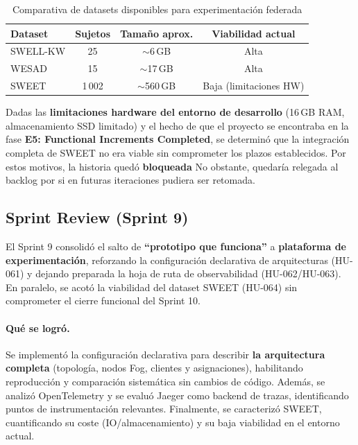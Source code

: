 \documentclass{report}
\begin{document}
\begin{table}[H]
\centering
\footnotesize
\caption{Comparativa de datasets disponibles para experimentación federada}
\label{tab:dataset_comparison}
\renewcommand{\arraystretch}{1.2}
\begin{tabular}{|l|c|c|c|}
\hline
\textbf{Dataset} & \textbf{Sujetos} & \textbf{Tamaño aprox.} & \textbf{Viabilidad actual} \\ \hline
SWELL-KW & 25 & $\sim$6\,GB & Alta \\ \hline
WESAD & 15 & $\sim$17\,GB & Alta \\ \hline
SWEET & 1\,002 & $\sim$560\,GB & Baja (limitaciones HW) \\ \hline
\end{tabular}
\end{table}

Dadas las \textbf{limitaciones hardware del entorno de desarrollo} (16\,GB RAM, almacenamiento SSD limitado) y el hecho de que el proyecto se encontraba en la fase \textbf{E5: Functional Increments Completed}, se determinó que la integración completa de SWEET no era viable sin comprometer los plazos establecidos. Por estos motivos, la historia quedó \textbf{bloqueada}
No obstante, quedaría relegada al backlog por si en futuras iteraciones pudiera ser retomada.

\subsection{Sprint Review (Sprint 9)}
El Sprint 9 consolidó el salto de \textbf{“prototipo que funciona”} a \textbf{plataforma de experimentación}, reforzando la configuración declarativa de arquitecturas (HU-061) y dejando preparada la hoja de ruta de observabilidad (HU-062/HU-063). En paralelo, se acotó la viabilidad del dataset SWEET (HU-064) sin comprometer el cierre funcional del Sprint 10.

\vspace{0.15em}
\paragraph{Qué se logró.}
Se implementó la configuración declarativa para describir \textbf{la arquitectura completa} (topología, nodos Fog, clientes y asignaciones), habilitando reproducción y comparación sistemática sin cambios de código. Además, se analizó OpenTelemetry y se evaluó Jaeger como backend de trazas, identificando puntos de instrumentación relevantes. Finalmente, se caracterizó SWEET, cuantificando su coste (IO/almacenamiento) y su baja viabilidad en el entorno actual.
\end{document}
